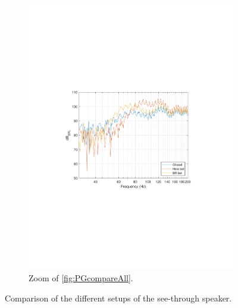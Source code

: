 \begin{figure}
\begin{subfigure}{.5\textwidth}
		\includegraphics[width=.9\linewidth, clip, trim={3.9cm 8.4cm 4.5cm 9cm}]{gfx/SpeakerMeas/PGcompareZoom.pdf}
		\caption{Zoom of \cref{fig:PGcompareAll}.}
		\label{fig:PGcompareZoom}
	\end{subfigure}
	\caption{Comparison of the different setups of the see-through speaker.}
	\label{fig:PGcompare}
\end{figure}

\FloatBarrier